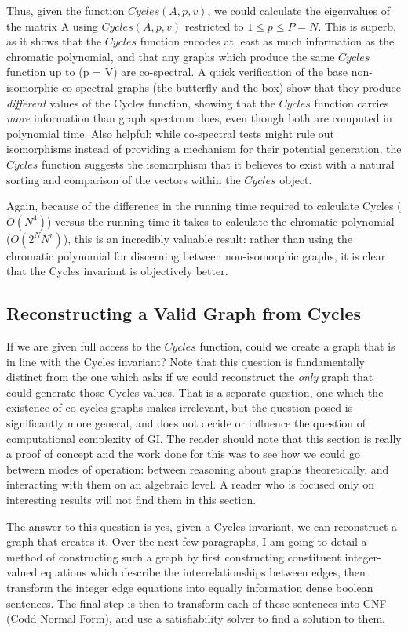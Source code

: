 Thus, given the function $Cycles(A, p, v)$, we could calculate the eigenvalues of the matrix A using $Cycles(A, p, v)$ restricted to $1 \leq p \leq P = N$. 
This is superb, as it shows that the $Cycles$ function encodes at least as much information as the chromatic polynomial, and that any graphs which produce the same $Cycles$ function up to (p = V) are co-spectral. 
A quick verification of the base non-isomorphic co-spectral graphs (the butterfly and the box) show that they produce \emph{different} values of the Cycles function, showing that the $Cycles$ function carries \emph{more} information than graph spectrum does, even though both are computed in polynomial time. 
Also helpful: while co-spectral tests might rule out isomorphisms instead of providing a mechanism for their potential generation, the $Cycles$ function suggests the isomorphism that it believes to exist with a natural sorting and comparison of the vectors within the $Cycles$ object.

Again, because of the difference in the running time required to calculate Cycles ($O(N^4)$) versus the running time it takes to calculate the chromatic polynomial ($O(2^N N^r)$), this is an incredibly valuable result: rather than using the chromatic polynomial for discerning between non-isomorphic graphs, it is clear that the Cycles invariant is objectively better.

\subsection{Reconstructing a Valid Graph from Cycles}
If we are given full access to the $Cycles$ function, could we create a graph that is in line with the Cycles invariant?
Note that this question is fundamentally distinct from the one which asks if we could reconstruct the \emph{only} graph that could generate those Cycles values.
That is a separate question, one which the existence of co-cycles graphs makes irrelevant, but the question posed is significantly more general, and does not decide or influence the question of computational complexity of GI.
The reader should note that this section is really a proof of concept and the work done for this was to see how we could go between modes of operation: between reasoning about graphs theoretically, and interacting with them on an algebraic level.
A reader who is focused only on interesting results will not find them in this section.

The answer to this question is yes, given a Cycles invariant, we can reconstruct a graph that creates it. 
Over the next few paragraphs, I am going to detail a method of constructing such a graph by first constructing constituent integer-valued equations which describe the interrelationships between edges, then transform the integer edge equations into equally information dense boolean sentences. 
The final step is then to transform each of these sentences into CNF (Codd Normal Form), and use a satisfiability solver to find a solution to them.

